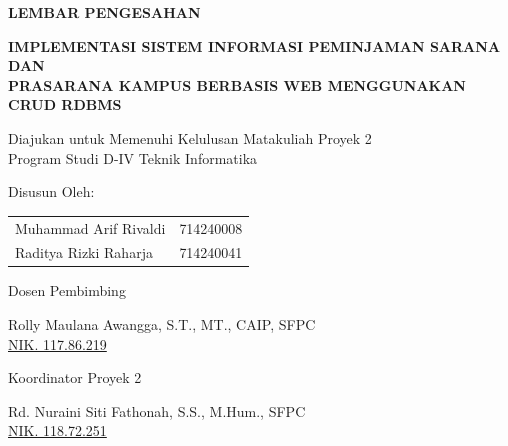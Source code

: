 
\clearpage
{}

\fancyhfoffset[L]{1.25cm}
\fancyhfoffset[R]{-1.25cm}

{}

\vfill

\begin{center}
    {\fontsize{14}{16}\selectfont\bfseries LEMBAR PENGESAHAN}
\end{center}

\vspace{0.8cm}

\begin{center}
    {\bfseries\fontsize{12}{14}\selectfont
    IMPLEMENTASI SISTEM INFORMASI PEMINJAMAN SARANA DAN\\
    PRASARANA KAMPUS BERBASIS WEB MENGGUNAKAN CRUD RDBMS}
\end{center}

\vspace{0.8cm}

\begin{center}
    Diajukan untuk Memenuhi Kelulusan Matakuliah Proyek 2 \\
    Program Studi D-IV Teknik Informatika
    
    \vspace{1cm}
    Disusun Oleh:
    
    \vspace{0.3cm}
    \begin{tabular}{lc}
        Muhammad Arif Rivaldi & 714240008 \\
        Raditya Rizki Raharja & 714240041
    \end{tabular}
\end{center}

\vspace{1.5cm}

\noindent
\begin{minipage}[t]{0.48\textwidth}
    \begin{center}
        Dosen Pembimbing
        \vspace{2.5cm} 
        
        Rolly Maulana Awangga, S.T., MT., CAIP, SFPC\\
        \underline{NIK. 117.86.219}
    \end{center}
\end{minipage}%
\hfill%
\begin{minipage}[t]{0.48\textwidth}
    \begin{center}
        Koordinator Proyek 2
        \vspace{2.5cm} 
        
        Rd. Nuraini Siti Fathonah, S.S., M.Hum., SFPC\\
        \underline{NIK. 118.72.251}
    \end{center}
\end{minipage}

